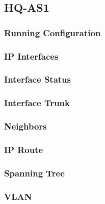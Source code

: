 \subsection{HQ-AS1}
\subsubsection{Running Configuration}


\subsubsection{IP Interfaces}


\subsubsection{Interface Status}


\subsubsection{Interface Trunk}


\subsubsection{Neighbors}


\subsubsection{IP Route}


\subsubsection{Spanning Tree}


\subsubsection{VLAN}




